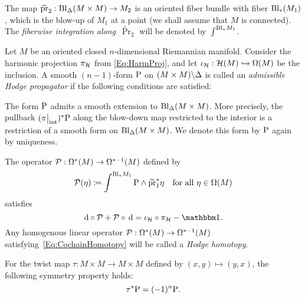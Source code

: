 \documentclass[\MainFolder/Text.tex]{subfiles}
\begin{document}
The map $\widetilde{\operatorname{\mathrm{pr}}}_2: \mathrm{Bl}_\Delta(M\times M) \rightarrow M_2$ is an oriented fiber bundle with fiber $\mathrm{Bl}_{*}(M_1)$, which is the blow-up of $M_1$ at a point (we shall assume that $M$ is connected). The \emph{fiberwise integration along~$\widetilde{\Pr}_2$} will be denoted by~$\int^{\mathrm{Bl}_* M_1}$. 

\begin{Def} \label{Def:GreenKernel}
Let $M$ be an oriented closed $n$-dimensional Riemannian manifold. Consider the harmonic projection $\pi_{\mathcal{H}}$ from \eqref{Eq:HarmProj}, and let $\iota_{\mathcal{H}}: \mathcal{H}(M) \xhookrightarrow{} \Omega(M)$ be the inclusion. 
A smooth $(n-1)$-form $\mathrm{P}$ on $(M\times M)\backslash \Delta$ is called an \emph{admissible Hodge propagator} if the following conditions are satisfied:
\begin{PlainList}
\item The form $\mathrm{P}$ admits a smooth extension to $\mathrm{Bl}_\Delta(M\times M)$. More precisely, the pullback $(\Restr{\pi}{\mathrm{int}})^* \Prpg$ along the blow-down map restricted to the interior is a restriction of a smooth form on $\mathrm{Bl}_\Delta(M\times M)$. We denote this form by $\mathrm{P}$ again by uniqueness.
\item The operator $\mathcal{P}: \Omega^*(M) \rightarrow \Omega^{*-1}(M)$ defined by
\begin{equation} \label{Eq:SchwKer}
\mathcal{P}(\eta) \coloneqq \int^{\mathrm{Bl}_* M_1} \mathrm{P} \wedge \widetilde{\operatorname{\mathrm{pr}}}_1^* \eta \quad \text{for all }\eta\in \Omega(M)
\end{equation}
satisfies
\begin{equation} \label{Eq:CochainHomotopy}
\Dd\circ\Htp + \Htp\circ\,\Dd = \iota_{\Harm}\circ \pi_{\Harm} - \Id.
\end{equation}
Any homogenous linear operator $\mathcal{P}: \Omega^*(M) \rightarrow \Omega^{*-1}(M)$ satisfying~\eqref{Eq:CochainHomotopy} will be called a \emph{Hodge homotopy}.%
\item For the twist map $\tau: M \times M \rightarrow M \times M$ defined by $(x,y)\mapsto (y,x)$, the following symmetry property holds:
\begin{equation}\label{Eq:SymProp}
\tau^* \mathrm{P} = (-1)^n \mathrm{P}. 
\end{equation}
\end{PlainList}
\end{Def}
\end{document}
